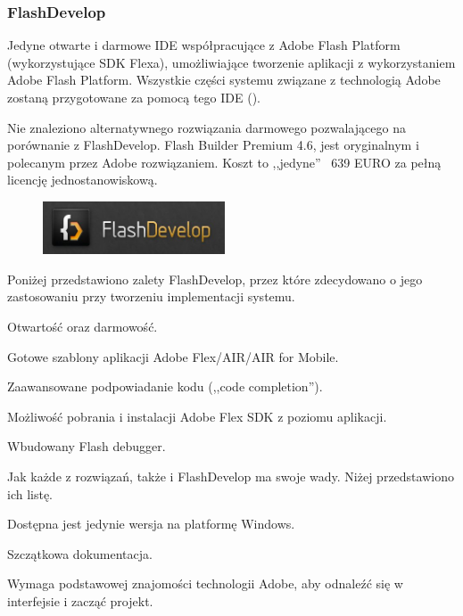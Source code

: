 \newpage
\subsubsection{FlashDevelop}
Jedyne otwarte i darmowe IDE współpracujące z Adobe Flash Platform (wykorzystujące SDK Flexa), umożliwiające tworzenie aplikacji z wykorzystaniem Adobe Flash Platform. Wszystkie części systemu związane z technologią Adobe zostaną przygotowane za pomocą tego IDE (\cite{flashDevelop}).

Nie znaleziono alternatywnego rozwiązania darmowego pozwalającego na porównanie z FlashDevelop. Flash Builder Premium 4.6, jest oryginalnym i polecanym przez Adobe rozwiązaniem. Koszt to ,,jedyne'' ~639 EURO za pełną licencję jednostanowiskową.

\begin{figure}
  \begin{center}
    \includegraphics[width=0.48\textwidth]{img/logos/flashdevelop.jpg}
  \end{center}
\end{figure}

Poniżej przedstawiono zalety FlashDevelop, przez które zdecydowano o jego zastosowaniu przy tworzeniu implementacji systemu.
\begin{packed_item}
    \item{Otwartość oraz darmowość.}
    \item{Gotowe szablony aplikacji Adobe Flex/AIR/AIR for Mobile.}
    \item{Zaawansowane podpowiadanie kodu (,,code completion'').}
    \item{Możliwość pobrania i instalacji  Adobe Flex SDK z poziomu aplikacji.}
    \item{Wbudowany Flash debugger.}
\end{packed_item}

Jak każde z rozwiązań, także i FlashDevelop ma swoje wady. Niżej przedstawiono ich listę.
\begin{packed_item}
    \item{Dostępna jest jedynie wersja na platformę Windows.}
    \item{Szczątkowa dokumentacja.}
    \item{Wymaga podstawowej znajomości technologii Adobe, aby odnaleźć się w interfejsie i zacząć projekt.}
\end{packed_item}


